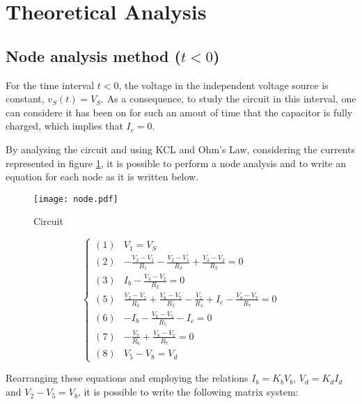 \section{Theoretical Analysis}
\label{sec:analysis}

\subsection{Node analysis method ($t < 0$)}
\label{sec:node}

For the time interval $t < 0$, the voltage in the independent voltage source is constant, $v_S(t) = V_S$. As a consequence, to study the circuit in this interval, one can considere it has been on for such an amout of time  that the capacitor is fully charged, which implies that $I_c = 0$.

By analysing the circuit and using KCL and Ohm's Law, considering the currents represented in figure \ref{1node_fig}, it is possible to perform a node analysis and to write an equation for each node as it is written below.

\begin{figure}[H]
  \centering
  \texttt{[image: node.pdf]}
  \caption{Circuit}
  \label{1node_fig}
\end{figure}

\begin{equation}
  \begin{cases}
    (1) & V_1 = V_S \\
    (2) & -\frac{V_2-V_1}{R_1} - \frac{V_2-V_5}{R_3} + \frac{V_3-V_2}{R_2} = 0 \\
    (3) & I_b - \frac{V_3-V_2}{R_2} = 0 \\
    (5) & \frac{V_2-V_5}{R_3} + \frac{V_6-V_5}{R_5} - \frac{V_5}{R_4} + I_c - \frac{V_8-V_7}{R_7} = 0 \\
    (6) & -I_b - \frac{V_6-V_5}{R_5} - I_c = 0 \\
    (7) & -\frac{V_7}{R_6} + \frac{V_8-V_7}{R_7} = 0 \\
    (8) & V_5-V_8 = V_d
  \end{cases}
\end{equation}

Rearranging these equations and employing the relations $I_b = K_bV_b$, $V_d = K_dI_d$ and $V_2-V_5 = V_b$, it is possible to write the following matrix system:

